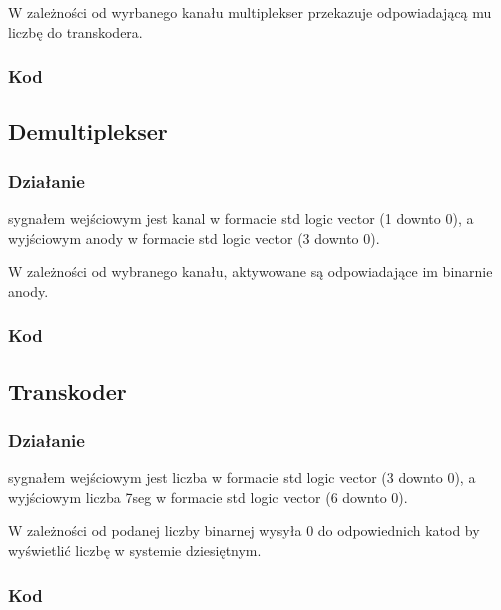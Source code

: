 \vspace*{0.5cm}

\hspace*{0.5cm}W zależności od wyrbanego kanału multiplekser przekazuje odpowiadającą mu liczbę do transkodera.
\subsubsection{Kod}


\subsection{Demultiplekser}
\subsubsection{Działanie}
\hspace*{0.5cm}sygnałem wejściowym jest kanal w formacie std logic vector (1 downto 0), a wyjściowym anody w formacie std logic vector (3 downto 0).

\vspace*{0.5cm}

\hspace*{0.5cm}W zależności od wybranego kanału, aktywowane są odpowiadające im binarnie anody.
\subsubsection{Kod}


\subsection{Transkoder}
\subsubsection{Działanie}
\hspace*{0.5cm}sygnałem wejściowym jest liczba w formacie std logic vector (3 downto 0), a wyjściowym liczba 7seg w formacie std logic vector (6 downto 0).

\vspace*{0.5cm}

\hspace*{0.5cm}W zależności od podanej liczby binarnej wysyła $0$ do odpowiednich katod by wyświetlić liczbę w systemie dziesiętnym.
\subsubsection{Kod}
